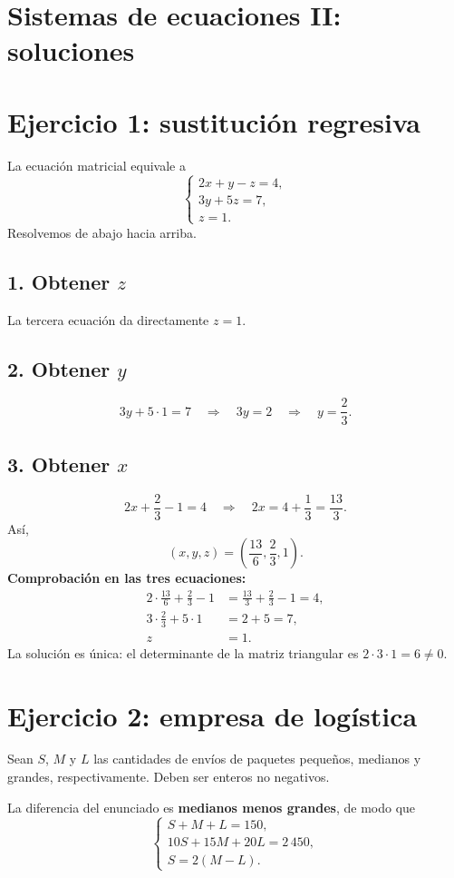 \documentclass[11pt]{article}
\begin{document}
\section*{Sistemas de ecuaciones II: soluciones}
\section*{Ejercicio 1: sustitución regresiva}
La ecuación matricial equivale a
\[
\begin{cases}2x+y-z=4,\\3y+5z=7,\\z=1.\end{cases}
\]
Resolvemos de abajo hacia arriba.
\subsection*{1. Obtener $z$}
La tercera ecuación da directamente $z=1$.
\subsection*{2. Obtener $y$}
\[3y+5\cdot1=7\quad\Longrightarrow\quad3y=2\quad\Longrightarrow\quad y=\frac23.\]
\subsection*{3. Obtener $x$}
\[2x+\frac23-1=4\quad\Longrightarrow\quad2x=4+\frac13=\frac{13}3.\]
Así,
\[\boxed{(x,y,z)=\left(\frac{13}6,\frac23,1\right)}.\]
\textbf{Comprobación en las tres ecuaciones:}
\begin{align*}
2\cdot\frac{13}6+\frac23-1&=\frac{13}3+\frac23-1=4,\\
3\cdot\frac23+5\cdot1&=2+5=7,\\
z&=1.
\end{align*}
La solución es única: el determinante de la matriz triangular es $2\cdot3\cdot1=6\neq0$.
\clearpage
\section*{Ejercicio 2: empresa de logística}
Sean $S$, $M$ y $L$ las cantidades de envíos de paquetes pequeños, medianos y grandes, respectivamente. Deben ser enteros no negativos.

La diferencia del enunciado es \textbf{medianos menos grandes}, de modo que
\[
\begin{cases}S+M+L=150,\\10S+15M+20L=2\,450,\\S=2(M-L).\end{cases}
\]
\end{document}
